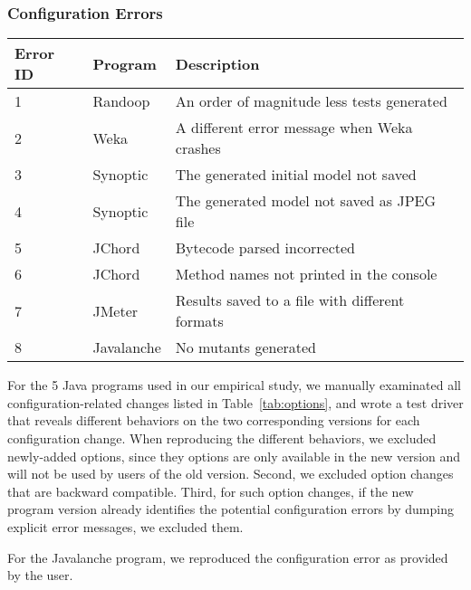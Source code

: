 \subsubsection{Configuration Errors}

\begin{table}[t]
\vspace{1mm}
\centering
\small{
\setlength{\tabcolsep}{.80\tabcolsep}
\begin{tabular}{|l||l|l|}
\hline
 Error ID& Program & Description\\
 \hline
 \hline
 1 & Randoop  & An order of magnitude less tests generated \\
 2 & Weka &  A different error message when Weka crashes\\
 3 & Synoptic & The generated initial model not saved\\
 4 & Synoptic & The generated model not saved as JPEG file \\
 5 & JChord & Bytecode parsed incorrected \\
 6 & JChord &  Method names not printed in the console\\
 7 & JMeter &  Results saved to a file with different formats\\
 8 & Javalanche &  No mutants generated\\
\hline
\end{tabular}
}
\vspace{-2mm}
\end{table}



For the 5 Java programs used in our empirical study,
we manually examinated all configuration-related changes
listed in Table~\ref{tab:options},
and wrote a test driver that reveals different
behaviors on the two corresponding versions for each configuration change.
When reproducing the different behaviors,
we excluded newly-added options, since
they options are only available in the new version
and will not be used by users of the old version.
Second, we excluded option changes that are backward
compatible. Third, for such option changes, if the
new program version already identifies the potential
configuration errors by dumping explicit error messages,
we excluded them. 

For the Javalanche program, we reproduced the configuration
error as provided by the user.

